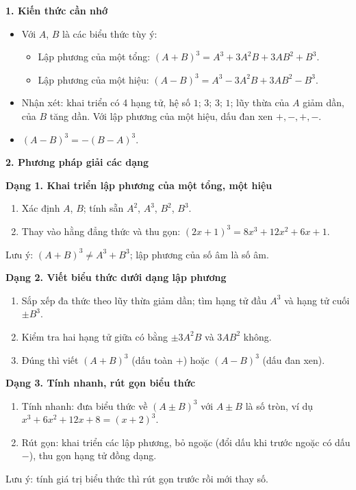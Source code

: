 \textbf{1. Kiến thức cần nhớ}
\begin{itemize}
\item Với $A$, $B$ là các biểu thức tùy ý:
\begin{itemize}
\item Lập phương của một tổng: $\boxed{(A+B)^3=A^3+3A^2B+3AB^2+B^3}$.
\item Lập phương của một hiệu: $\boxed{(A-B)^3=A^3-3A^2B+3AB^2-B^3}$.
\end{itemize}
\item Nhận xét: khai triển có 4 hạng tử, hệ số $1;\,3;\,3;\,1$; lũy thừa của $A$ giảm dần, của $B$ tăng dần. Với lập phương của một hiệu, dấu đan xen $+,-,+,-$.
\item $(A-B)^3=-(B-A)^3$.
\end{itemize}

\textbf{2. Phương pháp giải các dạng}

\textbf{Dạng 1. Khai triển lập phương của một tổng, một hiệu}
\begin{enumerate}
\item Xác định $A$, $B$; tính sẵn $A^2$, $A^3$, $B^2$, $B^3$.
\item Thay vào hằng đẳng thức và thu gọn: $(2x+1)^3=8x^3+12x^2+6x+1$.
\end{enumerate}
Lưu ý: $(A+B)^3\ne A^3+B^3$; lập phương của số âm là số âm.

\textbf{Dạng 2. Viết biểu thức dưới dạng lập phương}
\begin{enumerate}
\item Sắp xếp đa thức theo lũy thừa giảm dần; tìm hạng tử đầu $A^3$ và hạng tử cuối $\pm B^3$.
\item Kiểm tra hai hạng tử giữa có bằng $\pm 3A^2B$ và $3AB^2$ không.
\item Đúng thì viết $(A+B)^3$ (dấu toàn $+$) hoặc $(A-B)^3$ (dấu đan xen).
\end{enumerate}

\textbf{Dạng 3. Tính nhanh, rút gọn biểu thức}
\begin{enumerate}
\item Tính nhanh: đưa biểu thức về $(A\pm B)^3$ với $A\pm B$ là số tròn, ví dụ $x^3+6x^2+12x+8=(x+2)^3$.
\item Rút gọn: khai triển các lập phương, bỏ ngoặc (đổi dấu khi trước ngoặc có dấu $-$), thu gọn hạng tử đồng dạng.
\end{enumerate}
Lưu ý: tính giá trị biểu thức thì rút gọn trước rồi mới thay số.
